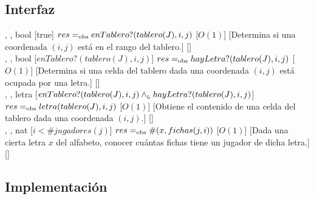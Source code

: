 \begin{interfaz}{\subsection{Interfaz}}
\begin{operaciones}
    \noindent{}
    {, , }{bool}
    [true]
    {$res=_{\mathrm{obs}} enTablero?(tablero(J),i,j)$}
    [$O(1)$]
    [Determina si una coordenada $(i,j)$ está en el rango del tablero.]
    [\falta]\\

    \noindent{}
    {, , }{bool}
    [$enTablero?(tablero(J),i,j)$]
    {$res=_{\mathrm{obs}} hayLetra?(tablero(J),i,j)$}
    [$O(1)$]
    [Determina si una celda del tablero dada una coordenada $(i,j)$ está ocupada por una letra.]
    [\falta]\\

    \noindent{}
    {, , }{letra}
    [$enTablero?(tablero(J),i,j)\land_{\mathrm{\scriptscriptstyle{L}}} hayLetra?(tablero(J),i,j)$]
    {$res=_{\mathrm{obs}} letra(tablero(J),i,j)$}
    [$O(1)$]
    [Obtiene el contenido de una celda del tablero dada una coordenada $(i,j)$.]
    [\falta]\\

    \noindent{}
    {, , }{nat}
    [$i < \#jugadores(j)$]
    {$res=_{\mathrm{obs}} \#(x,fichas(j,i))$}
    [$O(1)$]
    [Dada una cierta letra $x$ del alfabeto, conocer cuántas fichas tiene un jugador de dicha letra.]
    [\falta]\\

  \end{operaciones}
\end{interfaz}

\newpage
\subsection{Implementación}

